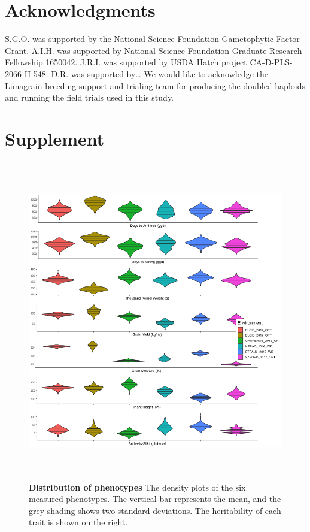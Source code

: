 \documentclass[article,9pt,twocolumn,twoside]{rilabRxiv}
\newcommand{\jri}[1]{{\small \textcolor{red}{#1}}}
\newcommand{\beginsupplement}{%
        \setcounter{table}{0}
        \renewcommand{\thetable}{S\arabic{table}}%
        \setcounter{figure}{0}
        \renewcommand{\thefigure}{S\arabic{figure}}%
     }
\begin{document}


\section{Acknowledgments}
S.G.O. was supported by the National Science Foundation Gametophytic Factor Grant. A.I.H. was supported by National Science Foundation Graduate Research Fellowship 1650042. J.R.I. was supported by USDA Hatch project CA-D-PLS-2066-H 548. D.R. was supported by…
We would like to acknowledge the Limagrain breeding support and trialing team for producing the doubled haploids and running the field trials used in this study.



\onecolumn
\beginsupplement
\section*{Supplement}
\begin{figure}[hb]
\centering
\includegraphics[width=\linewidth,height=14cm]{figures/Methods_Fig2_violinplot.png}
\caption{\textbf{Distribution of phenotypes} The density plots of the six measured phenotypes. The vertical bar represents the mean, and the grey shading shows two standard deviations. The heritability of each trait is shown on the right.}
\label{fig:supfigure1}
\end{figure}
\end{document}
